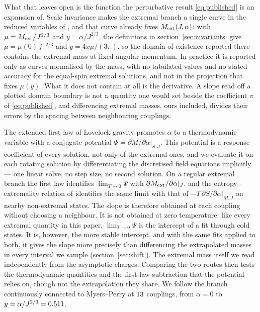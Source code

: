 \documentclass[11pt,a4paper]{article}
\begin{document}
What that leaves open is the function the perturbative result
\eqref{eq:published} is an expansion of. Scale invariance makes the extremal
branch a single curve in the reduced variables of \cite{Kleihaus:2023zzs}, and
that curve already fixes $M_{\mathrm{ext}}(J,\alpha)$: with $\mu=M_{\mathrm{ext}}/J^{2/3}$ and
$y=\alpha/J^{2/3}$, the definitions in section~\ref{sec:invariants} give
$\mu=\mu(0)\,j^{-2/3}$ and $y=4x\mu/(3\pi)$, so the domain of existence
reported there contains the extremal mass at fixed angular momentum. In
practice it is reported only as curves normalised by the mass, with no
tabulated values and no stated accuracy for the equal-spin extremal solutions,
and not in the projection that fixes $\mu(y)$. What it does not contain at all
is the derivative. A slope read off a plotted domain boundary is not a quantity
one would set beside the coefficient $\pi$ of \eqref{eq:published}, and
differencing extremal masses, ours included, divides their errors by the
spacing between neighbouring couplings.

The extended first law of Lovelock gravity \cite{Kastor:2010gq,Neri:2024}
promotes $\alpha$ to a thermodynamic variable with a conjugate potential
$\Psi=\partial M/\partial\alpha|_{S,J}$. This potential is a response
coefficient of every solution, not only of the extremal ones, and we evaluate
it on each rotating solution by differentiating the discretised field
equations implicitly --- one linear solve, no step size, no second solution.
On a regular extremal branch the first law identifies $\lim_{T\to0}\Psi$ with
$\partial M_{\mathrm{ext}}/\partial\alpha|_J$, and the entropy--extremality relation of
\cite{Goon:2019faz} identifies the same limit with that of
$-T\,\partial S/\partial\alpha|_{M,J}$ on nearby non-extremal states. The slope is therefore obtained at each coupling
without choosing a neighbour. It is not obtained at zero temperature: like
every extremal quantity in this paper, $\lim_{T\to0}\Psi$ is the intercept of
a fit through cold states. It is, however, the more stable intercept, and with
the same fits applied to both, it gives the slope more precisely than
differencing the extrapolated masses in every interval we sample
(section~\ref{sec:shift}). The extremal mass itself we read independently from
the asymptotic charges. Comparing the two routes then tests the thermodynamic
quantities and the first-law subtraction that the potential relies on, though
not the extrapolation they share. We follow the branch continuously connected
to Myers--Perry at $13$ couplings, from $\alpha=0$ to
$y=\alpha/J^{2/3}=0.511$.
\end{document}
